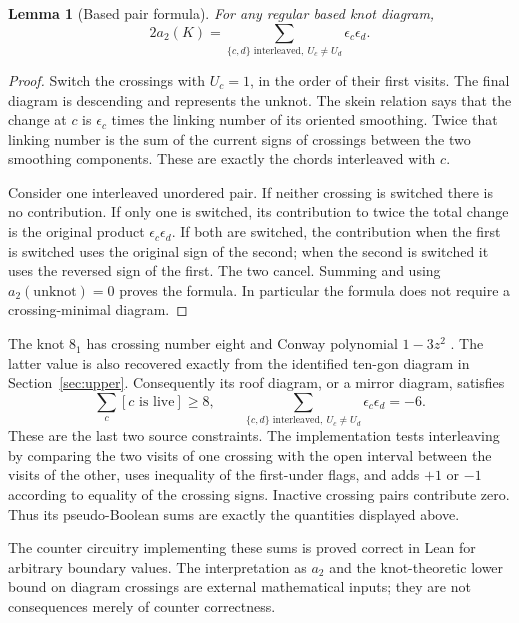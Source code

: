 \documentclass[11pt]{article}
\newtheorem{lemma}[theorem]{Lemma}
\begin{document}
\begin{lemma}[Based pair formula]\label{lem:a2}
For any regular based knot diagram,
\begin{equation}\label{eq:a2}
 2a_2(K)=\sum_{\{c,d\}\text{ interleaved},\ U_c\ne U_d}
                \epsilon_c\epsilon_d.
\end{equation}
\end{lemma}
\begin{proof}
Switch the crossings with $U_c=1$, in the order of their first visits.
The final diagram is descending and represents the unknot. The skein
relation says that the change at $c$ is $\epsilon_c$ times the linking
number of its oriented smoothing. Twice that linking number is the
sum of the current signs of crossings between the two smoothing
components. These are exactly the chords interleaved with $c$.

Consider one interleaved unordered pair. If neither crossing is switched
there is no contribution. If only one is switched, its contribution to
twice the total change is the original product
$\epsilon_c\epsilon_d$. If both are switched, the contribution when the
first is switched uses the original sign of the second; when the second
is switched it uses the reversed sign of the first. The two cancel.
Summing and using $a_2(\mathrm{unknot})=0$ proves the formula. In
particular the formula does not require a crossing-minimal diagram.
\end{proof}

The knot $8_1$ has crossing number eight and Conway polynomial
$1-3z^2$ \cite{katlas}. The latter value is also recovered exactly from the identified
ten-gon diagram in Section~\ref{sec:upper}. Consequently its roof
diagram, or a mirror diagram, satisfies
\[
 \sum_c [c\text{ is live}]\geq8,\qquad
 \sum_{\{c,d\}\text{ interleaved},\ U_c\ne U_d}
                 \epsilon_c\epsilon_d=-6.
\]
These are the last two source constraints. The implementation tests
interleaving by comparing the two visits of one crossing with the
open interval between the visits of the other, uses inequality of the
first-under flags, and adds $+1$ or $-1$ according to equality of the
crossing signs. Inactive crossing pairs contribute zero. Thus its
pseudo-Boolean sums are exactly the quantities displayed above.

The counter circuitry implementing these sums is proved correct in
Lean for arbitrary boundary values. The interpretation as $a_2$ and
the knot-theoretic lower bound on diagram crossings are external
mathematical inputs; they are not consequences merely of counter correctness.
\end{document}
